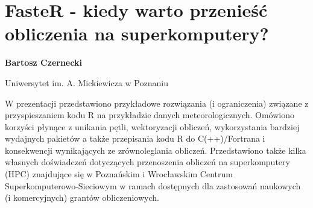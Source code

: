 \documentclass[\main/boa.tex]{subfiles}
\begin{document}
\section{FasteR - kiedy warto przenieść obliczenia na superkomputery?}

\begin{minipage}{0.915\textwidth}
	\centering
  {\bf {} Bartosz Czernecki}
\end{minipage}

\vskip 0.3cm

\begin{affiliations}
\begin{minipage}{0.915\textwidth}
\centering
Uniwersytet im. A. Mickiewicza w Poznaniu  \\[-2pt]
\end{minipage}
\end{affiliations}

\vskip 0.8cm

W prezentacji przedstawiono przykładowe rozwiązania (i ograniczenia) związane z przyspieszaniem kodu R na przykładzie danych meteorologicznych. Omówiono korzyści płynące z unikania pętli, wektoryzacji obliczeń, wykorzystania bardziej wydajnych pakietów a także przepisania kodu R do C(++)/Fortrana i konsekwencji wynikających ze zrównoleglania obliczeń. 
Przedstawiono także kilka własnych doświadczeń dotyczących przenoszenia obliczeń na superkomputery (HPC) znajdujące się w Poznańskim i Wrocławskim Centrum Superkomputerowo-Sieciowym w ramach dostępnych dla zastosowań naukowych (i komercyjnych) grantów obliczeniowych.
\end{document}

